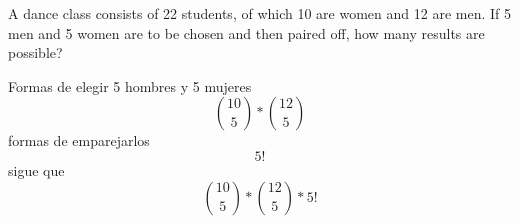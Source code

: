 \item A dance class consists of 22 students, of which 10 are women and 12 are men. If 5 men and 5 women are to be chosen and then paired off, how many results are possible?

Formas de elegir 5 hombres y 5 mujeres
\[ \binom{10}{5} * \binom{12}{5} \]
formas de emparejarlos
\[ 5! \]
sigue que
\[ \binom{10}{5} * \binom{12}{5} * 5! \]